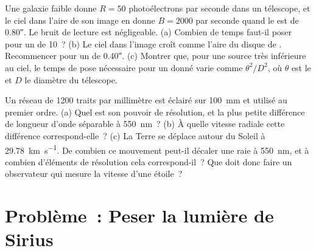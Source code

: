 \begin{exercise}[$\star\star\star$]\label{exo:b1:observing-the-sky:11}
Une galaxie faible donne $R = 50$ photoélectrons par seconde dans un télescope,
et le ciel dans l'aire de son image en donne $B = \num{2000}$ par seconde quand
le  est de \ang{;;0.80}. Le bruit de lecture est négligeable. (a) Combien
de temps faut-il poser pour un  de 10~? (b) Le ciel
dans l'image croît comme l'aire du disque de . Recommencer pour un 
de \ang{;;0.40}. (c) Montrer que, pour une source très inférieure au ciel, le
temps de pose nécessaire pour un  donné varie comme
$\theta^2/D^2$, où $\theta$ est le  et $D$ le diamètre du télescope.
\end{exercise}

\begin{exercise}[$\star\star\star$]\label{exo:b1:observing-the-sky:12}
Un réseau de 1200 traits par millimètre est éclairé sur \qty{100}{mm} et
utilisé au premier ordre. (a) Quel est son pouvoir de résolution, et la plus
petite différence de longueur d'onde séparable à \qty{550}{nm}~? (b) À quelle
vitesse radiale cette différence correspond-elle~? (c) La Terre se déplace
autour du Soleil à \qty{29.78}{km.s^{-1}}. De combien ce mouvement peut-il
décaler une raie à \qty{550}{nm}, et à combien d'éléments de résolution cela
correspond-il~? Que doit donc faire un observateur qui mesure la vitesse d'une
étoile~?
\end{exercise}

\section{Problème~: Peser la lumière de Sirius}

